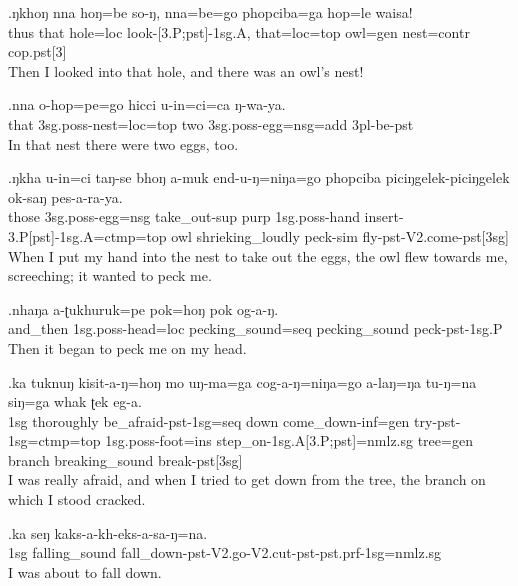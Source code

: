 \exg.ŋkhoŋ nna  hoŋ=be    so-ŋ, nna=be=go         phopciba=ga    hop=le           waisa!\\
 thus    that hole{\sc =loc} look{\sc -[3.P;pst]-1sg.A,} that{\sc =loc=top}  owl{\sc =gen} nest{\sc =contr} {\sc cop.pst[3]}\\
Then I looked into that hole, and there was an owl's nest!


\exg.nna  o-hop=pe=go                  hicci u-in=ci=ca                     ŋ-wa-ya.\\
 that {\sc 3sg.poss-}nest{\sc =loc=top}  two   {\sc 3sg.poss-}egg{\sc =nsg=add} {\sc 3pl-}be{\sc -pst}\\
In that nest there were two eggs, too.

\exg.ŋkha u-in=ci              taŋ-se            bhoŋ a-muk           end-u-ŋ=niŋa=go  phopciba piciŋgelek-piciŋgelek ok-saŋ pes-a-ra-ya.\\
 those {\sc 3sg.poss-}egg{\sc =nsg} take\_out{\sc -sup} {\sc purp}  {\sc 1sg.poss-}hand insert{\sc -3.P[pst]-1sg.A=ctmp=top}  owl      shrieking\_loudly        peck{\sc -sim} fly{\sc -pst-V2.come-pst[3sg]}\\
When I put my hand into the nest to take out the eggs, the owl flew towards me, screeching; it wanted to peck me.

\exg.nhaŋa   a-ʈukhuruk=pe            pok=hoŋ             pok           og-a-ŋ.\\
 and\_then {\sc 1sg.poss-}head{\sc =loc} pecking\_sound{\sc =seq}  pecking\_sound peck{\sc -pst-1sg.P}\\
Then it began to peck me on my head.

\exg.ka  tuknuŋ    kisit-a-ŋ=hoŋ mo   uŋ-ma=ga cog-a-ŋ=niŋa=go a-laŋ=ŋa tu-ŋ=na siŋ=ga    whak   ʈek           eg-a.\\
 {\sc 1sg} thoroughly be\_afraid{\sc -pst-1sg=seq}  down come\_down{\sc -inf=gen} try{\sc -pst-1sg=ctmp=top}
 {\sc 1sg.poss-}foot{\sc =ins} step\_on{\sc -1sg.A[3.P;pst]=nmlz.sg} tree{\sc =gen} branch breaking\_sound break{\sc -pst[3sg]}\\
I was really afraid, and when I tried to get down from the tree, the branch on which I stood cracked.

\exg.ka  seŋ          kaks-a-kh-eks-a-sa-ŋ=na.\\
 {\sc 1sg} falling\_sound fall\_down{\sc -pst-V2.go-V2.cut-pst-pst.prf-1sg=nmlz.sg}\\
I was about to fall down.

